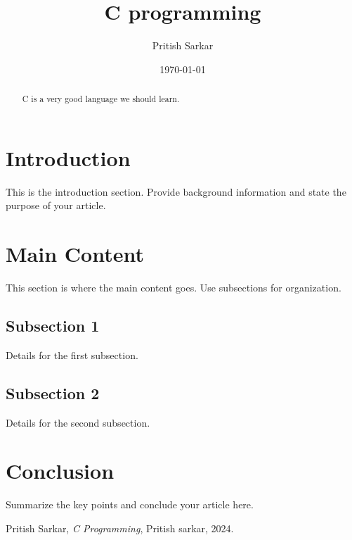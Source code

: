 \documentclass{article}
\title{C programming}
\author{Pritish Sarkar}
\date{\today}
\begin{document}
\maketitle 

\begin{abstract}
C is a very good language we should learn.

\end{abstract}

\section{Introduction}
This is the introduction section. Provide background information and state the purpose of your article.

\section{Main Content}
This section is where the main content goes. Use subsections for organization.

\subsection{Subsection 1}
Details for the first subsection.

\subsection{Subsection 2}
Details for the second subsection.

\section{Conclusion}
Summarize the key points and conclude your article here.

\begin{thebibliography}{9}
Pritish Sarkar, \textit{C Programming}, Pritish sarkar, 2024.
\end{thebibliography}
\end{document}
